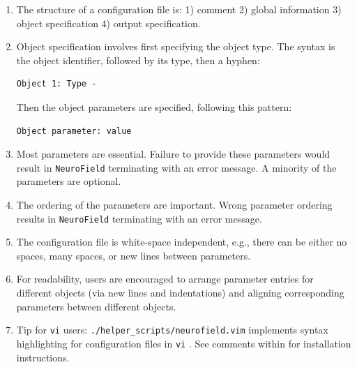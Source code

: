 \documentclass[12pt,a4paper]{article}
\newcommand{\type}[1]{ {\small\small\tt #1} }
\newcommand{\NF}[0]{ \type{NeuroField}}
\begin{document}
\begin{enumerate}
	\item The structure of a configuration file is: 1) comment 2) global information 3) object specification 4) output specification.
	\item Object specification involves first specifying the object type. The syntax is the object identifier, followed by its type, then a hyphen:
		\begin{lstlisting}
Object 1: Type -
		\end{lstlisting}
		Then the object parameters are specified, following this pattern:
		\begin{lstlisting}
Object parameter: value
		\end{lstlisting}
	\item Most parameters are essential. Failure to provide these parameters would result in \NF terminating with an error message. A minority of the parameters are optional.
	\item The ordering of the parameters are important. Wrong parameter ordering results in \NF terminating with an error message.
	\item The configuration file is white-space independent, e.g., there can be either no spaces, many spaces, or new lines between parameters.
	\item For readability, users are encouraged to arrange parameter entries for different objects (via new lines and indentations) and aligning corresponding parameters between different objects.
	\item Tip for \type{vi} users: \type{./helper\_scripts/neurofield.vim} implements syntax highlighting for configuration files in \type{vi}. See comments within for installation instructions.
\end{enumerate}
\end{document}
